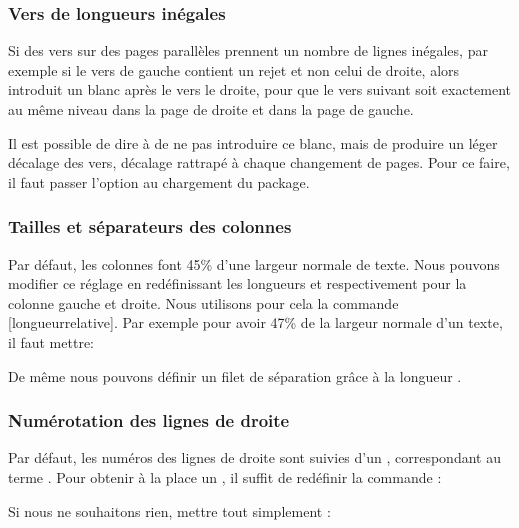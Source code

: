 \subsubsection{Vers de longueurs inégales}

Si des vers sur des pages parallèles prennent un nombre de lignes inégales, par exemple si le vers de gauche contient un rejet et non  celui de droite, alors  introduit un blanc après le vers le droite, pour que le vers suivant soit exactement au même niveau dans la page de droite et dans la page de gauche.

Il est possible de dire à  de ne pas introduire ce blanc, mais de produire un léger décalage des vers, décalage rattrapé à chaque changement de pages. Pour ce faire, il faut passer l'option  au chargement du package.

\begin{latexcode}
\usepackage[shiftedverses]{eledpar}
\end{latexcode}
 
 \subsubsection{Tailles et séparateurs des colonnes}

Par défaut, les colonnes font 45\% d'une largeur normale de texte. Nous pouvons modifier ce réglage en redéfinissant les longueurs  et  respectivement pour la colonne gauche et droite. Nous utilisons pour cela la commande [longueurrelative]. Par exemple pour avoir 47\% de la largeur normale d'un texte, il faut mettre:

\begin{latexcode}
\setlength{\Lcolwidth}{0.47\textwidth}
\setlength{\Rcolwidth}{0.47\textwidth}
\end{latexcode}

De même nous pouvons définir un filet de séparation grâce à la longueur .

\begin{latexcode}
\setlength{columnrulewidth}{0.4pt}
\end{latexcode}


\subsubsection{Numérotation des lignes de droite}

Par défaut, les numéros des lignes de droite sont suivies d'un , correspondant au terme . Pour obtenir à la place un , il suffit de redéfinir la commande  :

\begin{latexcode}
\renewcommand{\Rlineflag}{D}
\end{latexcode}

Si nous ne souhaitons  rien, mettre tout simplement :


\begin{latexcode}
\renewcommand{\Rlineflag}{}
\end{latexcode}




